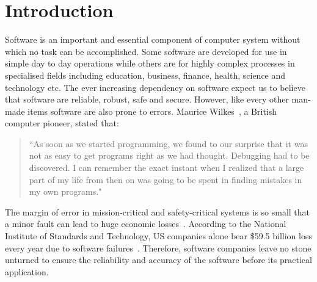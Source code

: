 \chapter{Introduction}

Software is an important and essential component of computer system without which no task can be accomplished. Some software are developed for use in simple day to day operations while others are for highly complex processes in specialised fields including education, business, finance, health, science and technology etc. The ever increasing dependency on software expect us to believe that software are reliable, robust, safe and secure. However, like every other man-made items software are also prone to errors. Maurice Wilkes~\cite{wilkes1985memoirs}, a British computer pioneer, stated that:
\begin{quote}
``As soon as we started programming, we found to our surprise that it was not as easy to get programs right as we had thought. Debugging had to be discovered. I can remember the exact instant when I realized that a large part of my life from then on was going to be spent in finding mistakes in my own programs."
\end{quote}
The margin of error in mission-critical and safety-critical systems is so small that a minor fault can lead to huge economic losses~\cite{huang2004securing}. According to the National Institute of Standards and Technology, US companies alone bear \$59.5 billion loss every year due to software failures~\cite{tassey2002economic}. Therefore, software companies leave no stone unturned to ensure the reliability and accuracy of the software before its practical application. 


